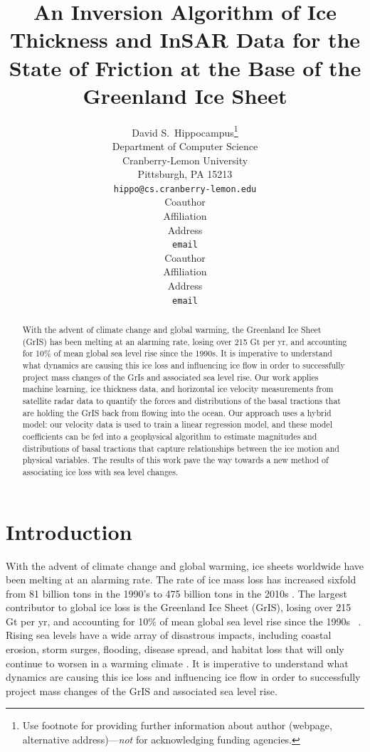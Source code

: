 \documentclass{article}
\title{An Inversion Algorithm of Ice Thickness and InSAR Data for
the State of Friction at the Base of the Greenland Ice Sheet}
\author{%
  David S.~Hippocampus\thanks{Use footnote for providing further information
    about author (webpage, alternative address)---\emph{not} for acknowledging
    funding agencies.} \\
  Department of Computer Science\\
  Cranberry-Lemon University\\
  Pittsburgh, PA 15213 \\
  \texttt{hippo@cs.cranberry-lemon.edu} \\
   \And
   Coauthor \\
   Affiliation \\
   Address \\
   \texttt{email} \\
   \AND
   Coauthor \\
   Affiliation \\
   Address \\
   \texttt{email} \\
}
\begin{document}
\maketitle

\begin{abstract}
With the advent of climate change and global warming, the Greenland Ice Sheet (GrIS) has been melting at an alarming rate, losing over 215 Gt per yr, and accounting for 10\% of mean global sea level rise since the 1990s. It is imperative to understand what dynamics are causing this ice loss and influencing ice flow in order to successfully project mass changes of the GrIs and associated sea level rise. Our work applies machine learning, ice thickness data, and horizontal ice velocity measurements from satellite radar data to quantify the forces and distributions of the basal tractions that are holding the GrIS back from flowing into the ocean. Our approach uses a hybrid model: our velocity data is used to train a linear regression model, and these model coefficients can be fed into a geophysical algorithm to estimate magnitudes and distributions of basal tractions that capture relationships between the ice motion and physical variables. The results of this work pave the way towards a new method of associating ice loss with sea level changes.
\end{abstract}

\section{Introduction}

With the advent of climate change and global warming, ice sheets worldwide have been melting at an alarming rate. The rate of ice mass loss has increased sixfold from 81 billion tons in the 1990’s to 475 billion tons in the 2010s \cite{the_imbie_team_mass_2020}. The largest contributor to global ice loss is the Greenland Ice Sheet (GrIS), losing over 215 Gt per yr, and accounting for 10\% of mean global sea level rise since the 1990s ~\cite{stocker_climate_2013}. Rising sea levels have a wide array of disastrous impacts, including coastal erosion, storm surges, flooding, disease spread, and habitat loss that will only continue to worsen in a warming climate \cite{pattyn_greenland_2018}. It is imperative to understand what dynamics are causing this ice loss and influencing ice flow in order to successfully project mass changes of the GrIS and associated sea level rise.
\end{document}
